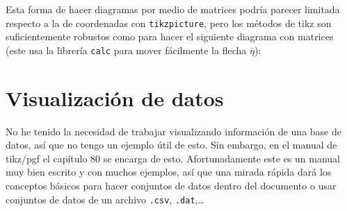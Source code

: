 Esta forma de hacer diagramas por medio de matrices podría parecer limitada
respecto a la de coordenadas con \texttt{tikzpicture}, pero los métodos de
tikz son suficientemente robustos como para hacer el siguiente diagrama con
matrices (este usa la librería \texttt{calc} para mover fácilmente la flecha
\(\bar{\eta}\)):
\begin{center}
\end{center}


\section{Visualización de datos}
No he tenido la necesidad de trabajar visualizando información de una base
de datos, así que no tengo un ejemplo útil de esto. Sin embargo, en el
manual de tikz/pgf el capítulo 80 se encarga de esto. Afortunadamente este
es un manual muy bien escrito y con muchos ejemplos, así que una mirada
rápida dará los conceptos básicos para hacer conjuntos de datos dentro del
documento o usar conjuntos de datos de un archivo \texttt{.csv},
\texttt{.dat},\ldots

